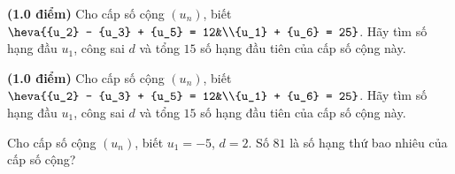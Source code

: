 
\begin{bt}%
	\textbf{(1.0 điểm)} Cho cấp số  cộng $(u_n)$, biết
	$\heva{{u_2} - {u_3} + {u_5} = 12&\\{u_1} + {u_6} = 25}$. Hãy tìm số hạng đầu $u_1$, công sai $d$ và tổng $15$ số hạng  đầu tiên của cấp số cộng này.
\end{bt}

\begin{ex}%
	 \textbf{(1.0 điểm)} Cho cấp số cộng $(u_n)$, biết
	$\heva{{u_2} - {u_3} + {u_5} = 12&\\{u_1} + {u_6} = 25}$. Hãy tìm  số hạng đầu $u_1$, công sai $d$ và tổng $15$ số hạng đầu tiên của cấp số cộng này.
\end{ex}

\begin{ex}%
	Cho cấp số cộng $\left(u_{n}\right)$, biết $u_{1}=-5$, $d=2$. Số $81$ là số hạng thứ bao nhiêu của cấp số  cộng?
\end{ex}

